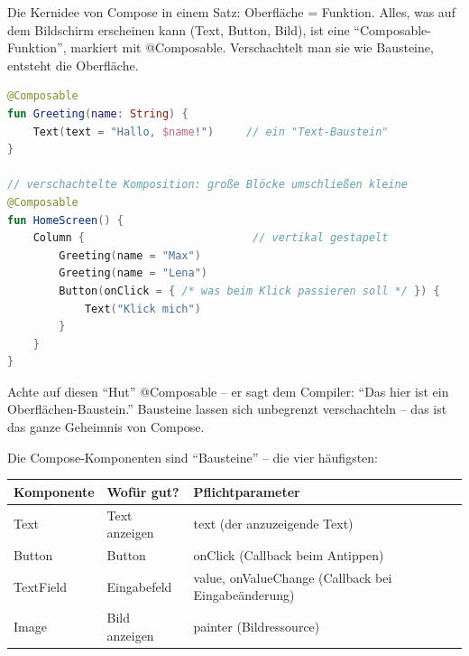 


Die Kernidee von Compose in einem Satz: Oberfläche = Funktion. Alles, was auf dem Bildschirm erscheinen kann (Text, Button, Bild), ist eine “Composable-Funktion”, markiert mit @Composable. Verschachtelt man sie wie Bausteine, entsteht die Oberfläche.

\begin{lstlisting}[language=Kotlin]
@Composable
fun Greeting(name: String) {
    Text(text = "Hallo, $name!")     // ein "Text-Baustein"
}

// verschachtelte Komposition: große Blöcke umschließen kleine
@Composable
fun HomeScreen() {
    Column {                          // vertikal gestapelt
        Greeting(name = "Max")
        Greeting(name = "Lena")
        Button(onClick = { /* was beim Klick passieren soll */ }) {
            Text("Klick mich")
        }
    }
}
\end{lstlisting}

Achte auf diesen “Hut” @Composable – er sagt dem Compiler: “Das hier ist ein Oberflächen-Baustein.” Bausteine lassen sich unbegrenzt verschachteln – das ist das ganze Geheimnis von Compose.


Die Compose-Komponenten sind “Bausteine” – die vier häufigsten:

\begin{center}
\begin{tabularx}{\linewidth}{|X|X|X|}
\hline
\textbf{Komponente} & \textbf{Wofür gut?} & \textbf{Pflichtparameter} \tabularnewline
\hline
Text & Text anzeigen & text (der anzuzeigende Text) \tabularnewline
Button & Button & onClick (Callback beim Antippen) \tabularnewline
TextField & Eingabefeld & value, onValueChange (Callback bei Eingabeänderung) \tabularnewline
Image & Bild anzeigen & painter (Bildressource) \tabularnewline
\hline
\end{tabularx}
\end{center}

